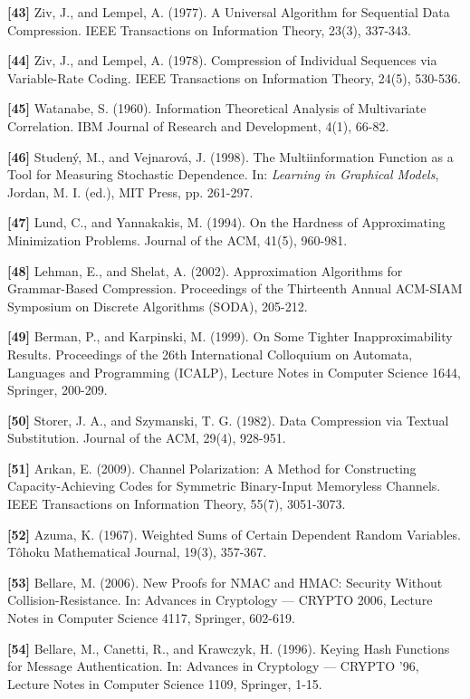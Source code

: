 \documentclass[
]{article}
\begin{document}
\textbf{{[}43{]}} Ziv, J., and Lempel, A. (1977). A Universal Algorithm
for Sequential Data Compression. IEEE Transactions on Information
Theory, 23(3), 337-343.

\textbf{{[}44{]}} Ziv, J., and Lempel, A. (1978). Compression of
Individual Sequences via Variable-Rate Coding. IEEE Transactions on
Information Theory, 24(5), 530-536.

\textbf{{[}45{]}} Watanabe, S. (1960). Information Theoretical
Analysis of Multivariate Correlation. IBM Journal of Research and
Development, 4(1), 66-82.

\textbf{{[}46{]}} Studen\'y, M., and Vejnarov\'a, J. (1998). The
Multiinformation Function as a Tool for Measuring Stochastic
Dependence. In: \emph{Learning in Graphical Models}, Jordan, M. I.
(ed.), MIT Press, pp. 261-297.

\textbf{{[}47{]}} Lund, C., and Yannakakis, M. (1994). On the
Hardness of Approximating Minimization Problems. Journal of the ACM,
41(5), 960-981.

\textbf{{[}48{]}} Lehman, E., and Shelat, A. (2002). Approximation
Algorithms for Grammar-Based Compression. Proceedings of the
Thirteenth Annual ACM-SIAM Symposium on Discrete Algorithms (SODA),
205-212.

\textbf{{[}49{]}} Berman, P., and Karpinski, M. (1999). On Some
Tighter Inapproximability Results. Proceedings of the 26th
International Colloquium on Automata, Languages and Programming
(ICALP), Lecture Notes in Computer Science 1644, Springer, 200-209.

\textbf{{[}50{]}} Storer, J. A., and Szymanski, T. G. (1982). Data
Compression via Textual Substitution. Journal of the ACM, 29(4),
928-951.

\textbf{{[}51{]}} Ar{\i}kan, E. (2009). Channel Polarization: A Method
for Constructing Capacity-Achieving Codes for Symmetric Binary-Input
Memoryless Channels. IEEE Transactions on Information Theory, 55(7),
3051-3073.

\textbf{{[}52{]}} Azuma, K. (1967). Weighted Sums of Certain Dependent
Random Variables. T\^ohoku Mathematical Journal, 19(3), 357-367.

\textbf{{[}53{]}} Bellare, M. (2006). New Proofs for NMAC and HMAC:
Security Without Collision-Resistance. In: Advances in Cryptology ---
CRYPTO 2006, Lecture Notes in Computer Science 4117, Springer, 602-619.

\textbf{{[}54{]}} Bellare, M., Canetti, R., and Krawczyk, H. (1996).
Keying Hash Functions for Message Authentication. In: Advances in
Cryptology --- CRYPTO '96, Lecture Notes in Computer Science 1109,
Springer, 1-15.
\end{document}
